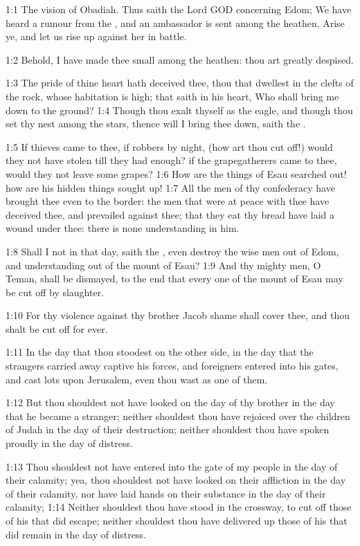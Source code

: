 

1:1 The vision of Obadiah. Thus saith the Lord GOD concerning Edom;
We have heard a rumour from the \LORD, and an ambassador is sent among
the heathen, Arise ye, and let us rise up against her in battle.

1:2 Behold, I have made thee small among the heathen: thou art greatly
despised.

1:3 The pride of thine heart hath deceived thee, thou that dwellest in
the clefts of the rock, whose habitation is high; that saith in his
heart, Who shall bring me down to the ground?  1:4 Though thou exalt
thyself as the eagle, and though thou set thy nest among the stars,
thence will I bring thee down, saith the \LORD.

1:5 If thieves came to thee, if robbers by night, (how art thou cut
off!)  would they not have stolen till they had enough? if the
grapegatherers came to thee, would they not leave some grapes?  1:6
How are the things of Esau searched out! how are his hidden things
sought up!  1:7 All the men of thy confederacy have brought thee even
to the border: the men that were at peace with thee have deceived
thee, and prevailed against thee; that they eat thy bread have laid a
wound under thee: there is none understanding in him.

1:8 Shall I not in that day, saith the \LORD, even destroy the wise men
out of Edom, and understanding out of the mount of Esau?  1:9 And thy
mighty men, O Teman, shall be dismayed, to the end that every one of
the mount of Esau may be cut off by slaughter.

1:10 For thy violence against thy brother Jacob shame shall cover
thee, and thou shalt be cut off for ever.

1:11 In the day that thou stoodest on the other side, in the day that
the strangers carried away captive his forces, and foreigners entered
into his gates, and cast lots upon Jerusalem, even thou wast as one of
them.

1:12 But thou shouldest not have looked on the day of thy brother in
the day that he became a stranger; neither shouldest thou have
rejoiced over the children of Judah in the day of their destruction;
neither shouldest thou have spoken proudly in the day of distress.

1:13 Thou shouldest not have entered into the gate of my people in the
day of their calamity; yea, thou shouldest not have looked on their
affliction in the day of their calamity, nor have laid hands on their
substance in the day of their calamity; 1:14 Neither shouldest thou
have stood in the crossway, to cut off those of his that did escape;
neither shouldest thou have delivered up those of his that did remain
in the day of distress.


